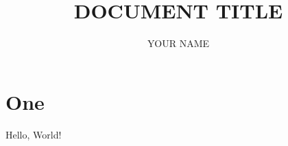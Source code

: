 \documentclass[twoside]{article}
\begin{document}
  \title{DOCUMENT TITLE}                               %
  \author{YOUR NAME}                        %

  \pagestyle{headings} %
  \thispagestyle{plain} %

  \maketitle


  \section{One}

  Hello, World!

\end{document}
